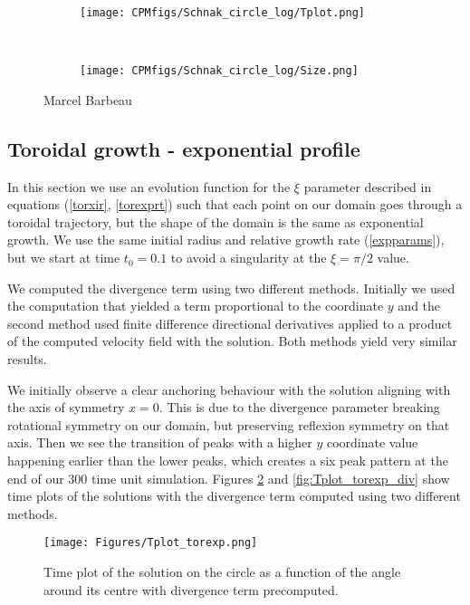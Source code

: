 \documentclass[fleqn,12pt]{siamart1116}
\begin{document}
\begin{figure}[ht]
  \begin{subfigure}[b]{1.00\textwidth}
	  \centering
		  \texttt{[image: CPMfigs/Schnak\_circle\_log/Tplot.png]}
	\end{subfigure}
	\\
	\begin{subfigure}[b]{1.00\textwidth}
	  \centering
		  \texttt{[image: CPMfigs/Schnak\_circle\_log/Size.png]}
	\end{subfigure}
	\caption{Marcel Barbeau}
	\label{fig:Schnak_log_Tplot}
\end{figure}

\subsection{Toroidal growth - exponential profile}
In this section we use an evolution function for the $\xi$ parameter described in equations (\ref{torxir}, \ref{torexprt}) such that each point on our domain goes through a toroidal trajectory, but the shape of the domain is the same as exponential growth. We use the same initial radius and relative growth rate (\ref{expparams}), but we start at time $t_0 = 0.1$ to avoid a singularity at the $\xi = \pi/2$ value.

We computed the divergence term using two different methods. Initially we used the computation that yielded a term proportional to the coordinate $y$ and the second method used finite difference directional derivatives applied to a product of the computed velocity field with the solution. Both methods yield very similar results.

We initially observe a clear anchoring behaviour with the solution aligning with the axis of symmetry $x = 0$. This is due to the divergence parameter breaking rotational symmetry on our domain, but preserving reflexion symmetry on that axis. Then we see the transition of peaks with a higher $y$ coordinate value happening earlier than the lower peaks, which creates a six peak pattern at the end of our $300$ time unit simulation. Figures \ref{fig:Tplot_torexp} and \ref{fig:Tplot_torexp_div} show time plots of the solutions with the divergence term computed using two different methods.

\begin{figure}[ht]
	\centering
		\texttt{[image: Figures/Tplot\_torexp.png]}
	\caption{Time plot of the solution on the circle as a function of the angle around its centre with divergence term precomputed.}
	\label{fig:Tplot_torexp}
\end{figure}
\end{document}
